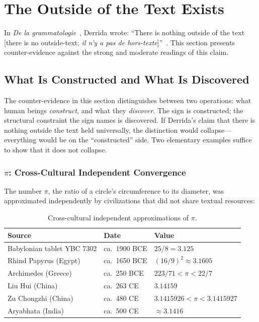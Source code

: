 \documentclass[a4paper,twocolumn,11pt]{article}
\begin{document}

\section{The Outside of the Text Exists}
\label{sec:outside}

In \emph{De la grammatologie}~\cite{Derrida1967}, Derrida wrote: ``There is nothing outside of the text [there is no outside-text; \emph{il n'y a pas de hors-texte}]''~\cite[p.~158]{Derrida1976}. This section presents counter-evidence against the strong and moderate readings of this claim.

\subsection{What Is Constructed and What Is Discovered}

The counter-evidence in this section distinguishes between two operations: what human beings \emph{construct}, and what they \emph{discover}. The sign is constructed; the structural constraint the sign names is discovered. If Derrida's claim that there is nothing outside the text held universally, the distinction would collapse---everything would be on the ``constructed'' side. Two elementary examples suffice to show that it does not collapse.

\subsubsection*{$\pi$: Cross-Cultural Independent Convergence}

The number $\pi$, the ratio of a circle's circumference to its diameter, was approximated independently by civilizations that did not share textual resources:

\begin{table}[ht]
\centering
\small
\begin{tabular}{@{}lll@{}}
\toprule
Source & Date & Value \\
\midrule
Babylonian tablet YBC 7302 & ca.\ 1900 BCE & $25/8 = 3.125$ \\
Rhind Papyrus (Egypt) & ca.\ 1650 BCE & $(16/9)^2 \approx 3.1605$ \\
Archimedes (Greece) & ca.\ 250 BCE & $223/71 < \pi < 22/7$ \\
Liu Hui (China) & ca.\ 263 CE & $3.14159$ \\
Zu Chongzhi (China) & ca.\ 480 CE & $3.1415926 < \pi < 3.1415927$ \\
Aryabhata (India) & ca.\ 500 CE & $\approx 3.1416$ \\
\bottomrule
\end{tabular}
\caption{Cross-cultural independent approximations of $\pi$.\label{tab:pi}}
\end{table}
\end{document}

